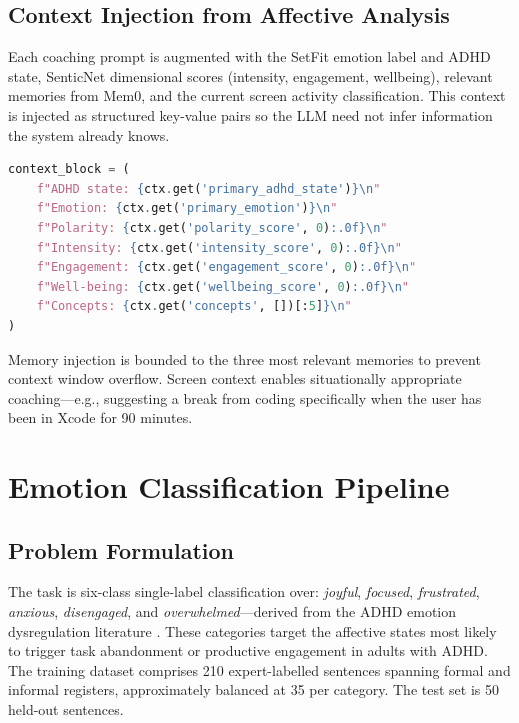 \subsection{Context Injection from Affective Analysis}
\label{subsec:context-injection}

Each coaching prompt is augmented with the SetFit emotion label and ADHD state, SenticNet dimensional scores (intensity, engagement, wellbeing), relevant memories from Mem0, and the current screen activity classification. This context is injected as structured key-value pairs so the LLM need not infer information the system already knows.

\begin{lstlisting}[language=Python, caption={Context injection into the LLM prompt (abbreviated).}, label={lst:context-injection}]
context_block = (
    f"ADHD state: {ctx.get('primary_adhd_state')}\n"
    f"Emotion: {ctx.get('primary_emotion')}\n"
    f"Polarity: {ctx.get('polarity_score', 0):.0f}\n"
    f"Intensity: {ctx.get('intensity_score', 0):.0f}\n"
    f"Engagement: {ctx.get('engagement_score', 0):.0f}\n"
    f"Well-being: {ctx.get('wellbeing_score', 0):.0f}\n"
    f"Concepts: {ctx.get('concepts', [])[:5]}\n"
)
\end{lstlisting}

Memory injection is bounded to the three most relevant memories to prevent context window overflow. Screen context enables situationally appropriate coaching---e.g., suggesting a break from coding specifically when the user has been in Xcode for 90 minutes.

\section{Emotion Classification Pipeline}
\label{sec:emotion-pipeline}

\subsection{Problem Formulation}
\label{subsec:emotion-formulation}

The task is six-class single-label classification over: \emph{joyful}, \emph{focused}, \emph{frustrated}, \emph{anxious}, \emph{disengaged}, and \emph{overwhelmed}---derived from the ADHD emotion dysregulation literature \cite{beattie2025, barkley2010}. These categories target the affective states most likely to trigger task abandonment or productive engagement in adults with ADHD. The training dataset comprises 210 expert-labelled sentences spanning formal and informal registers, approximately balanced at 35 per category. The test set is 50 held-out sentences.

